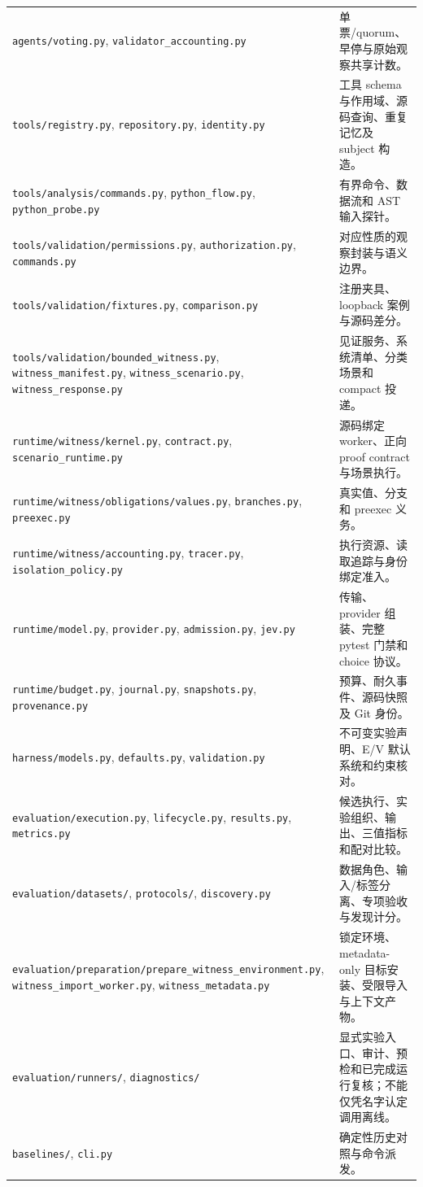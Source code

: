 \documentclass[UTF8,a4paper,zihao=-4,fontset=none]{ctexart}
\newcommand{\code}[1]{{\small\nolinkurl{#1}}}
\begin{document}
\begin{longtable}{L{66mm}L{83mm}}
\code{agents/voting.py}, \code{validator_accounting.py} & 单票/quorum、早停与原始观察共享计数。\\
\code{tools/registry.py}, \code{repository.py}, \code{identity.py} & 工具 schema 与作用域、源码查询、重复记忆及 subject 构造。\\
\code{tools/analysis/commands.py}, \code{python_flow.py}, \code{python_probe.py} & 有界命令、数据流和 AST 输入探针。\\
\code{tools/validation/permissions.py}, \code{authorization.py}, \code{commands.py} & 对应性质的观察封装与语义边界。\\
\code{tools/validation/fixtures.py}, \code{comparison.py} & 注册夹具、loopback 案例与源码差分。\\
\code{tools/validation/bounded_witness.py}, \code{witness_manifest.py}, \code{witness_scenario.py}, \code{witness_response.py} & 见证服务、系统清单、分类场景和 compact 投递。\\
\code{runtime/witness/kernel.py}, \code{contract.py}, \code{scenario_runtime.py} & 源码绑定 worker、正向 proof contract 与场景执行。\\
\code{runtime/witness/obligations/values.py}, \code{branches.py}, \code{preexec.py} & 真实值、分支和 preexec 义务。\\
\code{runtime/witness/accounting.py}, \code{tracer.py}, \code{isolation_policy.py} & 执行资源、读取追踪与身份绑定准入。\\
\code{runtime/model.py}, \code{provider.py}, \code{admission.py}, \code{jev.py} & 传输、provider 组装、完整 pytest 门禁和 choice 协议。\\
\code{runtime/budget.py}, \code{journal.py}, \code{snapshots.py}, \code{provenance.py} & 预算、耐久事件、源码快照及 Git 身份。\\
\code{harness/models.py}, \code{defaults.py}, \code{validation.py} & 不可变实验声明、E/V 默认系统和约束核对。\\
\code{evaluation/execution.py}, \code{lifecycle.py}, \code{results.py}, \code{metrics.py} & 候选执行、实验组织、输出、三值指标和配对比较。\\
\code{evaluation/datasets/}, \code{protocols/}, \code{discovery.py} & 数据角色、输入/标签分离、专项验收与发现计分。\\
\code{evaluation/preparation/prepare_witness_environment.py}, \code{witness_import_worker.py}, \code{witness_metadata.py} & 锁定环境、metadata-only 目标安装、受限导入与上下文产物。\\
\code{evaluation/runners/}, \code{diagnostics/} & 显式实验入口、审计、预检和已完成运行复核；不能仅凭名字认定调用离线。\\
\code{baselines/}, \code{cli.py} & 确定性历史对照与命令派发。\\
\bottomrule
\end{longtable}
\end{document}

